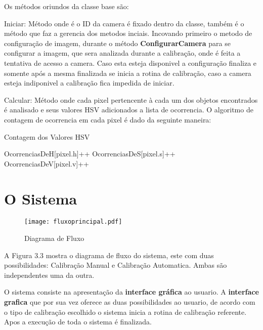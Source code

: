 Os métodos oriundos da classe base são: 
 
		\begin{description}
		\item Iniciar: Método onde é o ID da camera é fixado dentro da classe, também é o método que faz a gerencia dos metodos inciais. Incovando primeiro o metodo de configuração de imagem, durante o método \textbf{ConfigurarCamera} para se configurar a imagem, que sera analizada durante a calibração, onde é feita a tentativa de acesso a camera. Caso esta esteja disponivel a configuração finaliza e somente após a mesma finalizada se inicia a rotina de calibração, caso a camera esteja indiponivel a calibração fica impedida de iniciar.
		
		
		\item Calcular: Método onde cada pixel pertencente à cada um dos objetos encontrados é analisado e seus valores HSV adicionados a lista de ocorrencia. 
		O algoritmo de contagem de ocorrencia em cada pixel é dado da seguinte maneira:
 
	        
	        \begin{algorithm}
	       		 \caption{Contagem dos Valores HSV}
		        \begin{algorithmic}
		     	
		   				 \State OcorrenciasDeH[pixel.h]++ 
		    			 \State	OcorrenciasDeS[pixel.s]++ 
		     	  		 \State	OcorrenciasDeV[pixel.v]++
		     	   \EndFor
		     	\EndFor
		     		
		        \end{algorithmic}
	        
	        \end{algorithm}
		\end{description}	

	\section{O Sistema}

		\begin{figure}[!h]
			\centering
			\texttt{[image: fluxoprincipal.pdf]}
			\caption{Diagrama de Fluxo}
			\label{FlowCHart}
		\end{figure}
		A Figura 3.3 mostra o diagrama de fluxo do sistema, este com duas possibilidades: Calibração Manual e Calibração Automatica. Ambas são independentes uma da outra.  
		
		 O sistema consiste na apresentação da \textbf{interface gráfica} ao usuario. A \textbf{interface grafica} que por sua vez oferece as duas possibilidades ao usuario, de acordo com o tipo de calibração escolhido o sistema inicia a rotina de calibração referente. Apos a execução de toda o sistema é finalizada.
			
